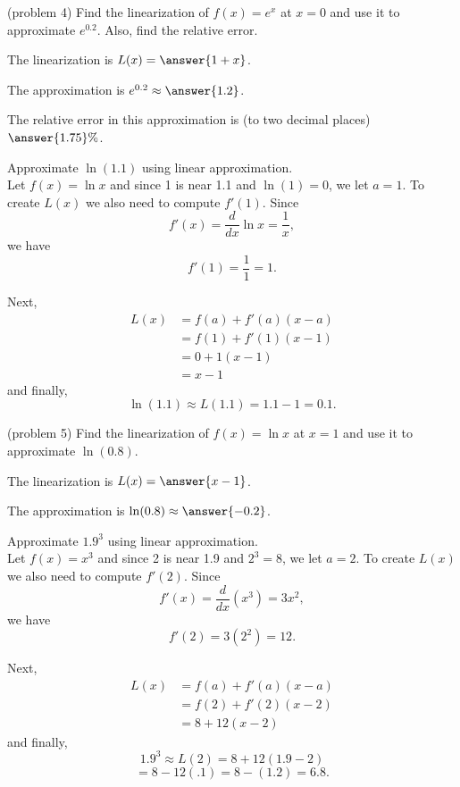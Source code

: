 \documentclass[handout]{ximera}
\begin{document}
 
 
 

\begin{problem}(problem 4)
Find the linearization of $f(x) = e^x$ at $x = 0$ and use it to approximate $e^{0.2}$.
Also, find the relative error.

The linearization is  $L(x) = \answer{1 + x}$.

The approximation is $e^{0.2} \approx \answer{1.2}$.

The relative error in this approximation is (to two decimal places) $\answer{1.75}\%$.


\end{problem}

\begin{example}[example 5]
Approximate $\ln(1.1)$ using linear approximation.\\ 
Let $f(x) = \ln x$ and since 1 is near 1.1 and $\ln(1) = 0$, we let 
$a = 1$. To create $L(x)$ we also need to compute $f'(1)$. 
Since 
\[f'(x) = \frac{d}{dx} \ln x = \frac{1}{x},\] 
we have
\[f'(1) = \frac{1}{1} = 1.\]

Next, 
\begin{align*}
L(x) &= f(a) + f'(a)(x - a) \\
&= f(1) + f'(1)(x - 1) \\
&= 0 + 1(x - 1)\\
&=x-1
\end{align*}
and finally,
\[\ln(1.1) \approx L(1.1) = 1.1 - 1 = 0.1.\]


\end{example}

\begin{problem}(problem 5)
Find the linearization of $f(x) = \ln x$ at $x = 1$ and use it to approximate $\ln(0.8)$.

The linearization is  $L(x) = \answer{x-1}$.

The approximation is $\ln(0.8) \approx \answer{-0.2}$.
\end{problem}

\begin{example}[example 6]
Approximate $1.9^3$ using linear approximation.\\ 
Let $f(x) = x^3$ and since 2 is near 1.9 and $2^3 = 8$, we let 
$a = 2$. To create $L(x)$ we also need to compute $f'(2)$. 
Since 
\[f'(x) = \frac{d}{dx} (x^3) = 3x^2,\] 
we have
\[f'(2) = 3(2^2) = 12.\]

Next, 
\begin{align*}
L(x) &= f(a) + f'(a)(x - a) \\
&= f(2) + f'(2)(x - 2) \\
&= 8 + 12(x - 2)
\end{align*}
and finally,
\[1.9^3 \approx L(2) = 8 + 12(1.9 - 2) \]
\[= 8 - 12(.1) = 8-(1.2) = 6.8.\]
\end{example}
\end{document}
